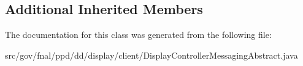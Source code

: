 \subsection*{Additional Inherited Members}


The documentation for this class was generated from the following file\-:\begin{DoxyCompactItemize}
\item 
src/gov/fnal/ppd/dd/display/client/Display\-Controller\-Messaging\-Abstract.\-java\end{DoxyCompactItemize}

